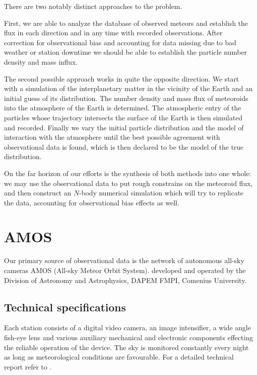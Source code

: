     There are two notably distinct approaches to the problem.

    First, we are able to analyze the database of observed meteors and establish
    the flux in each direction and in any time with recorded observations.
    After correction for observational bias and accounting for data missing due
    to bad weather or station downtime we should be able to establish the particle
    number density and mass influx.

    The second possible approach works in quite the opposite direction. We start with a simulation
    of the interplanetary matter in the vicinity of the Earth and an initial guess of its distribution.
    The number density and mass flux of meteoroids into the atmosphere of the Earth is determined.
    The atmospheric entry of the particles whose trajectory intersects the surface of the Earth
    is then simulated and recorded.
    Finally we vary the initial particle distribution and the model of interaction with the atmosphere
    until the best possible agreement with observational data is found, which is then
    declared to be the model of the true distribution.

    On the far horizon of our efforts is the synthesis of both methods into one whole:
    we may use the observational data to put rough constrains on the meteoroid flux,
    and then construct an $N$-body numerical simulation which will try to replicate the data,
    accounting for observational bias effects as well.

\section{AMOS} \label{iA}
    Our primary source of observational data is the network of autonomous all-sky cameras
    AMOS (All-sky Meteor Orbit System).
    developed and operated by the Division of Astronomy and Astrophysics, DAPEM FMPI, Comenius University.

    \subsection{Technical specifications} \label{iAt}
        Each station consists of a digital video camera, an image intensifier, a wide angle fish-eye lens
        and various auxiliary mechanical and electronic components effecting
        the reliable operation of the device. The sky is monitored constantly every night
        as long as meteorological conditions are favourable. For a detailed technical report refer to \citet{zigo2013}.

